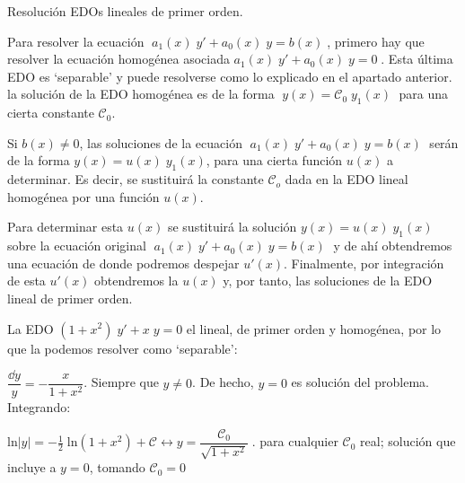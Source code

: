 \begin{cuadro-naranja}
\begin{teor}{Resolución EDOs lineales de primer orden.}

Para resolver la ecuación $\; a_1(x)\; y' +a_0(x)\; y = b(x)\; $, primero hay que resolver la ecuación homogénea asociada $a_1(x)\; y' +a_0(x)\; y = 0\; $. Esta última EDO es `separable' y puede resolverse como lo explicado en el apartado anterior. la solución de la EDO homogénea es de la forma $\; y(x)=\mathcal{C}_0\; y_1(x)\;$ para una cierta constante $\mathcal{C}_0$.

Si $b(x) \neq 0$, las soluciones de la ecuación  $\; a_1(x)\; y' +a_0(x)\; y = b(x)\; $ serán de la forma $y(x)=u(x)\; y_1(x)$, para una cierta función $u(x)$ a determinar. Es decir, se sustituirá la constante $\mathcal{C}_o$ dada en la EDO lineal homogénea por una función $u(x)$.

Para determinar esta  $u(x)$ se sustituirá la solución $y(x)=u(x)\; y_1(x)$ sobre la ecuación original $\; a_1(x)\; y' +a_0(x)\; y = b(x)\; $ y de ahí obtendremos una ecuación de donde podremos despejar $u'(x)$. Finalmente, por integración de esta $u'(x)$ obtendremos la  $u(x)$ y, por tanto, las soluciones de la EDO lineal de primer orden. 	
\end{teor}
\end{cuadro-naranja}

\begin{cuadro-gris}
\begin{ejem}
	La EDO $(1+x^2)\; y' + x\; y = 0$ el lineal, de primer orden y homogénea, por lo que la podemos resolver como `separable':
	
	$\dfrac {\dd y}{y }=-\dfrac {x}{1+x^2}$. Siempre que $y \neq 0$. De hecho, $y=0$ es solución del problema. Integrando:
	
	$\mathrm{ln} |y|=-\frac 1 2 \; \mathrm{ln} (1+x^2)+\mathcal{C} \leftrightarrow y=\dfrac {\mathcal{C}_0}{\sqrt{1+x^2}}\;$. para cualquier $\mathcal{C}_0$ real; solución que incluye a $y=0$, tomando $\mathcal{C}_0=0$
\end{ejem}
\end{cuadro-gris}

